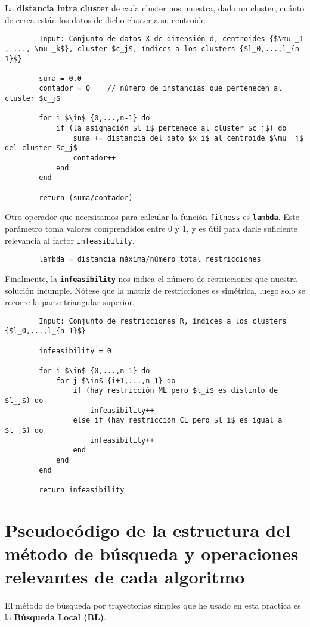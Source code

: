 		La \textbf{distancia intra cluster} de cada cluster nos muestra, dado un cluster, cuánto de cerca están los datos de dicho cluster a su centroide.

		\begin{lstlisting}
		Input: Conjunto de datos X de dimensión d, centroides {$\mu _1 , ..., \mu _k$}, cluster $c_j$, índices a los clusters {$l_0,...,l_{n-1}$}

		suma = 0.0
		contador = 0	// número de instancias que pertenecen al cluster $c_j$

		for i $\in$ {0,...,n-1} do
			if (la asignación $l_i$ pertenece al cluster $c_j$) do
				suma += distancia del dato $x_i$ al centroide $\mu _j$ del cluster $c_j$
				contador++
			end
		end

		return (suma/contador)
		\end{lstlisting}

		Otro operador que necesitamos para calcular la función \lstinline!fitness! es \textbf{\lstinline!lambda!}.
		Este parámetro toma valores comprendidos entre $0$ y $1$, y es útil para darle suficiente relevancia al factor \lstinline!infeasibility!. 

		\begin{lstlisting}
		lambda = distancia_máxima/número_total_restricciones
		\end{lstlisting}

		Finalmente, la \textbf{\lstinline!infeasibility!} nos indica el número de restricciones que nuestra solución incumple.
		Nótese que la matriz de restricciones es simétrica, luego solo se recorre la parte triangular superior.
		\begin{lstlisting}
		Input: Conjunto de restricciones R, índices a los clusters {$l_0,...,l_{n-1}$}

		infeasibility = 0

		for i $\in$ {0,...,n-1} do
			for j $\in$ {i+1,...,n-1} do
				if (hay restricción ML pero $l_i$ es distinto de $l_j$) do
					infeasibility++
				else if (hay restricción CL pero $l_i$ es igual a $l_j$) do
					infeasibility++
				end
			end
		end

		return infeasibility
		\end{lstlisting}

\newpage

\section{Pseudocódigo de la estructura del método de búsqueda y operaciones relevantes de cada algoritmo}
	El método de búsqueda por trayectorias simples que he usado en esta práctica es la \textbf{Búsqueda Local (BL)}.
	

